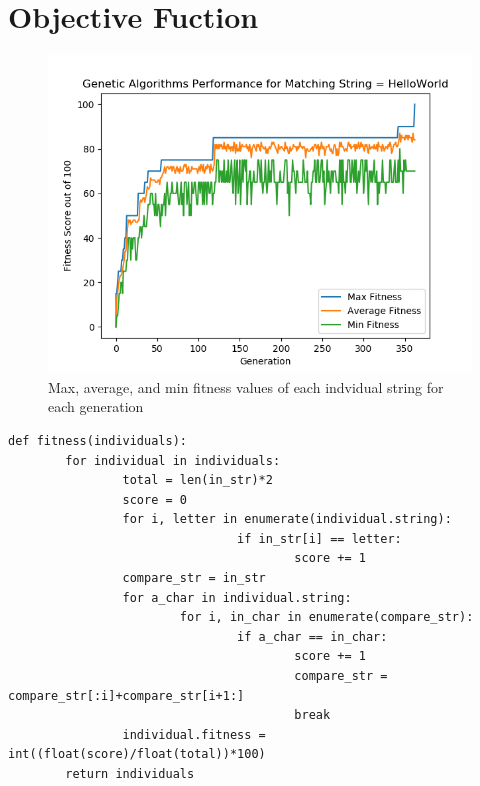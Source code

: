 \documentclass[12pt]{article}
\begin{document}
\section{Objective Fuction}

\begin{figure}[H]
        \centering
        \includegraphics[width=\textwidth]{figures/Figure_3.png}
        \caption{Max, average, and min fitness values of each indvidual string
for each generation}
        \label{fig:fitness}
\end{figure}

\begin{minipage}{\textwidth}

\begin{lstlisting}[caption = {Fitness Function}]
def fitness(individuals):
        for individual in individuals:
                total = len(in_str)*2
                score = 0
                for i, letter in enumerate(individual.string):
                                if in_str[i] == letter:
                                        score += 1
                compare_str = in_str
                for a_char in individual.string:
                        for i, in_char in enumerate(compare_str):
                                if a_char == in_char:
                                        score += 1
                                        compare_str = compare_str[:i]+compare_str[i+1:]
                                        break
                individual.fitness = int((float(score)/float(total))*100)                          
        return individuals
\end{lstlisting}
\end{minipage}
\end{document}
